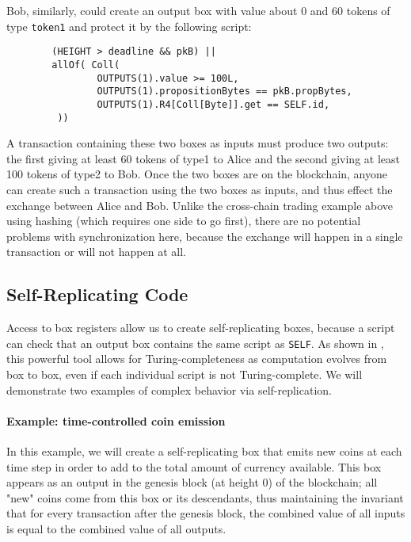 \documentclass[11pt]{article}
\begin{document}
Bob, similarly, could create an output box with value about 0 and 60 tokens of type \texttt{token1} and protect it by the following script:
\begin{verbatim}
        (HEIGHT > deadline && pkB) || 
        allOf( Coll(
                OUTPUTS(1).value >= 100L,
                OUTPUTS(1).propositionBytes == pkB.propBytes,
                OUTPUTS(1).R4[Coll[Byte]].get == SELF.id,
         ))
\end{verbatim}

A transaction containing these two boxes as inputs must produce two outputs: the first giving at least 60 tokens of type1 to Alice and the second giving at least 100 tokens of type2 to Bob. Once the two boxes are on the blockchain, anyone can create such a transaction using the two boxes as inputs, and thus effect the exchange between Alice and Bob. Unlike the cross-chain trading example above using hashing (which requires one side to go first), there are no potential problems with synchronization here, because the exchange will happen in a single transaction or will not happen at all.
\subsection{Self-Replicating Code}
\label{sec:self-replicating}
Access to box registers allow us to create self-replicating boxes, because a script can check that an output box contains the same script as \texttt{SELF}. As shown in \cite{CKM18}, this powerful tool allows for Turing-completeness as computation evolves from box to box, even if each individual script is not Turing-complete. We will demonstrate two examples of complex behavior via self-replication.

\paragraph{Example: time-controlled coin emission}
In this example, we will create a self-replicating box that emits new coins at each time step in order to add to the total amount of currency available. This box appears as an output in the genesis block (at height 0) of the blockchain; all "new" coins come from this box or its descendants, thus maintaining the invariant that for every transaction after the genesis block, the combined value of all inputs  is equal to the combined value of all outputs.
\end{document}
